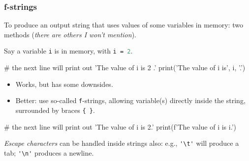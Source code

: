 \documentclass{beamer}
\newenvironment{codeblock}
    {\hfill\begin{beamerboxesrounded}[lower=codecol, width=0.8\textwidth]
    \medskip

    }
    { 
    \end{beamerboxesrounded}\hfill
    }
\theoremstyle{example}
\newcommand{\ct}[1]{\lstinline[language=Python]!#1!}
\newcommand{\ttt}[1]{{\small\texttt{#1}}}
\begin{document}
\begin{frame}[fragile]
\frametitle{{\ttm f}-strings}

To produce an output string that uses values of some variables in memory: two methods (\emph{there are others I won't mention}).

Say a variable \ttt{i} is in memory, with \ttt{i = }\ct{2}.

\begin{codeblock}

\begin{python}
# the next line will print out 'The value of i is 2 .'
print('The value of i is', i, '.')
\end{python}

\end{codeblock}

\begin{itemize}
	\item Works, but has some downsides. 
	\item Better: use so-called \ttt{f}-strings, allowing variable(s) directly inside the string, surrounded by braces \ttt{\{ \}}.
\end{itemize}

\begin{codeblock}

\begin{python}
# the next line will print out 'The value of i is 2.'
print(f'The value of i is {i}.')
\end{python}

\end{codeblock}

\emph{Escape characters} can be handled inside strings also: e.g., \verb|'\t'| will produce a tab; \verb|'\n'| produces a newline.

\end{frame}
\end{document}
